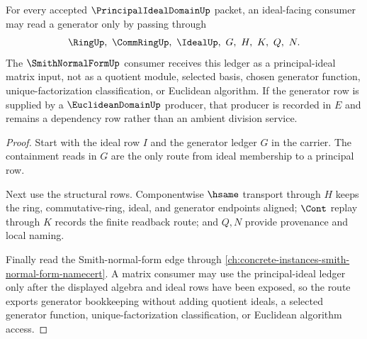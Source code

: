 \begin{theorem}
\label{thm:principal-ideal-domain-ideal-generator-ledger}
For every accepted $\PrincipalIdealDomainUp$ packet, an ideal-facing consumer may read a generator only by passing through
$$
\RingUp,\ \CommRingUp,\ \IdealUp,\ G,\ H,\ K,\ Q,\ N.
$$
The $\SmithNormalFormUp$ consumer receives this ledger as a principal-ideal matrix input, not as a quotient module, selected basis, chosen generator function, unique-factorization classification, or Euclidean algorithm. If the generator row is supplied by a $\EuclideanDomainUp$ producer, that producer is recorded in $E$ and remains a dependency row rather than an ambient division service.
\end{theorem}
\begin{proof}
Start with the ideal row $I$ and the generator ledger $G$ in the carrier. The containment reads in $G$ are the only route from ideal membership to a principal row.

Next use the structural rows. Componentwise $\hsame$ transport through $H$ keeps the ring, commutative-ring, ideal, and generator endpoints aligned; $\Cont$ replay through $K$ records the finite readback route; and $Q,N$ provide provenance and local naming.

Finally read the Smith-normal-form edge through \autoref{ch:concrete-instances-smith-normal-form-namecert}. A matrix consumer may use the principal-ideal ledger only after the displayed algebra and ideal rows have been exposed, so the route exports generator bookkeeping without adding quotient ideals, a selected generator function, unique-factorization classification, or Euclidean algorithm access.
\end{proof}


\begin{closurestatus}{\PrincipalIdealDomainUp}
  \theoryclosure{\seedClosure}
  \formalstatus{\unformalizedV}
\end{closurestatus}
